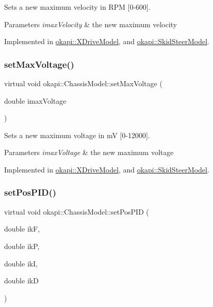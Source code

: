 Sets a new maximum velocity in R\+PM \mbox{[}0-\/600\mbox{]}.


\begin{DoxyParams}{Parameters}
{\em imax\+Velocity} & the new maximum velocity \\
\hline
\end{DoxyParams}


Implemented in \mbox{\hyperlink{classokapi_1_1XDriveModel_aec91f0569213bbca770ad4a25529beb6}{okapi\+::\+X\+Drive\+Model}}, and \mbox{\hyperlink{classokapi_1_1SkidSteerModel_a4beda353f201fa72fc8d31f47a08d473}{okapi\+::\+Skid\+Steer\+Model}}.

\mbox{\label{classokapi_1_1ChassisModel_a2fb261636b79e118f22530cc3fce4f41}} 
\subsubsection{\texorpdfstring{setMaxVoltage()}{setMaxVoltage()}}
{\footnotesize\ttfamily virtual void okapi\+::\+Chassis\+Model\+::set\+Max\+Voltage (\begin{DoxyParamCaption}\item[{double}]{imax\+Voltage }\end{DoxyParamCaption})\hspace{0.3cm}{\ttfamily [pure virtual]}}

Sets a new maximum voltage in mV \mbox{[}0-\/12000\mbox{]}.


\begin{DoxyParams}{Parameters}
{\em imax\+Voltage} & the new maximum voltage \\
\hline
\end{DoxyParams}


Implemented in \mbox{\hyperlink{classokapi_1_1XDriveModel_a6d001a2147ecb642f60cd21ac73c64ea}{okapi\+::\+X\+Drive\+Model}}, and \mbox{\hyperlink{classokapi_1_1SkidSteerModel_ad4dc0f8e3877b23ffb8ae58903bdffb7}{okapi\+::\+Skid\+Steer\+Model}}.

\mbox{\label{classokapi_1_1ChassisModel_a9743f82c90635ae7fc9a21d65509ba9b}} 
\subsubsection{\texorpdfstring{setPosPID()}{setPosPID()}}
{\footnotesize\ttfamily virtual void okapi\+::\+Chassis\+Model\+::set\+Pos\+P\+ID (\begin{DoxyParamCaption}\item[{double}]{ikF,  }\item[{double}]{ikP,  }\item[{double}]{ikI,  }\item[{double}]{ikD }\end{DoxyParamCaption})\hspace{0.3cm}{\ttfamily [pure virtual]}}

